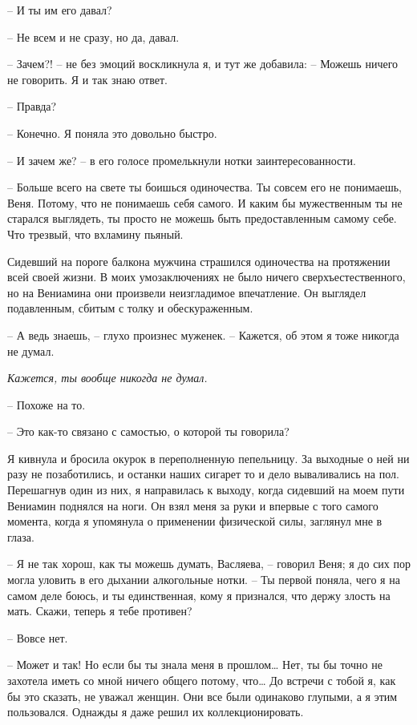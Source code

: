 \documentclass[
]{book}
\begin{document}
-- И ты им его давал?

-- Не всем и не сразу, но да, давал.

-- Зачем?! -- не без эмоций воскликнула я, и тут же добавила: -- Можешь ничего не говорить. Я и так знаю ответ.

-- Правда?

-- Конечно. Я поняла это довольно быстро.

-- И зачем же? -- в его голосе промелькнули нотки заинтересованности.

-- Больше всего на свете ты боишься одиночества. Ты совсем его не понимаешь, Веня. Потому, что не понимаешь себя самого. И каким бы мужественным ты не старался выглядеть, ты просто не можешь быть предоставленным самому себе. Что трезвый, что вхламину пьяный.

Сидевший на пороге балкона мужчина страшился одиночества на протяжении всей своей жизни. В моих умозаключениях не было ничего сверхъестественного, но на Вениамина они произвели неизгладимое впечатление. Он выглядел подавленным, сбитым с толку и обескураженным.

-- А ведь знаешь, -- глухо произнес муженек. -- Кажется, об этом я тоже никогда не думал.

\emph{Кажется, ты вообще никогда не думал.}

-- Похоже на то.

-- Это как-то связано с самостью, о которой ты говорила?

Я кивнула и бросила окурок в переполненную пепельницу. За выходные о ней ни разу не позаботились, и останки наших сигарет то и дело вываливались на пол. Перешагнув один из них, я направилась к выходу, когда сидевший на моем пути Вениамин поднялся на ноги. Он взял меня за руки и впервые с того самого момента, когда я упомянула о применении физической силы, заглянул мне в глаза.

-- Я не так хорош, как ты можешь думать, Васляева, -- говорил Веня; я до сих пор могла уловить в его дыхании алкогольные нотки. -- Ты первой поняла, чего я на самом деле боюсь, и ты единственная, кому я признался, что держу злость на мать. Скажи, теперь я тебе противен?

-- Вовсе нет.

-- Может и так! Но если бы ты знала меня в прошлом\ldots{} Нет, ты бы точно не захотела иметь со мной ничего общего потому, что\ldots{} До встречи с тобой я, как бы это сказать, не уважал женщин. Они все были одинаково глупыми, а я этим пользовался. Однажды я даже решил их коллекционировать.
\end{document}
